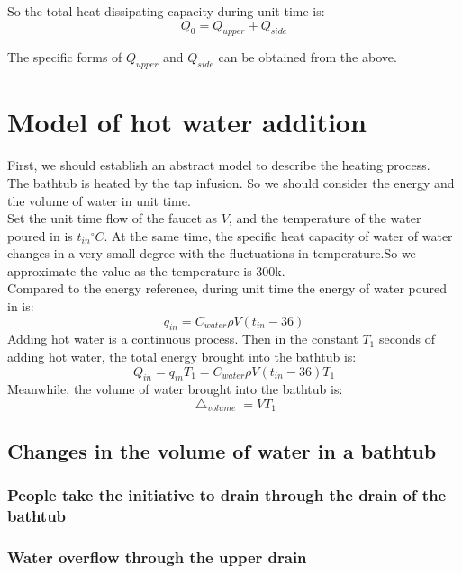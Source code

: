 \documentclass{mcmthesis}
\begin{document}
\indent So the total heat dissipating capacity during unit time is:
\begin{equation}
	Q_{0}=Q_{upper}+Q_{side}
\end{equation}


\indent The specific forms of $Q_{upper}$ and $Q_{side}$ can be obtained from the above. 

\section{Model of hot water addition}
\indent First, we should establish an abstract model to describe the heating process.\\
\indent The bathtub is heated by the tap infusion. So we should consider the energy and the volume of water in unit time. \\\indent Set the unit time flow of the faucet as $ V $, and the temperature of the water poured in is $ t_{in} {^\circ}C$. At the same time, the specific heat capacity of water of water changes in a very small degree with the fluctuations in temperature.So we approximate the value as the temperature is 300k. \\
\indent Compared to the energy reference, during unit time the energy of water poured in is:
\begin{equation}
	q_{in}=C_{water}\rho V(t_{in}-36) 
\end{equation}
\indent Adding hot water is a continuous process. Then in the constant $ T_{1} $ seconds of adding hot water, the total energy brought into the bathtub is:
\begin{equation}
	Q_{in}=q_{in}T_{1}=C_{water}\rho V(t_{in}-36)T_{1}
\end{equation}
\indent Meanwhile, the volume of water brought into the bathtub is:
\begin{equation}
	\bigtriangleup_{volume}=VT_{1} 
\end{equation}
\subsection{Changes in the volume of water in a bathtub}

\subsubsection{People take the initiative to drain through the drain of the bathtub}

\subsubsection{Water overflow through the upper drain}
\end{document}
